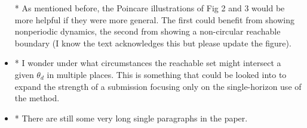 \documentclass[11pt]{article}
\begin{document}
\begin{itemize}
\begin{itshape}
            * As mentioned before, the Poincare illustrations of Fig 2 and 3 would be
            more helpful if they were more general.  The first could benefit from
            showing nonperiodic dynamics, the second from showing a non-circular
            reachable boundary (I know the text acknowledges this but please update the
            figure).  
        \end{itshape}

    \item
        \begin{itshape}

            * I wonder under what circumstances the reachable set might intersect a
            given $\theta_d$ in multiple places.  This is something that could be looked
            into to expand the strength of a submission focusing only on the
            single-horizon use of the method.
        \end{itshape}

    \item 
        \begin{itshape}

            * There are still some very long single paragraphs in the paper.
        \end{itshape}

\end{itemize}



\end{document}
